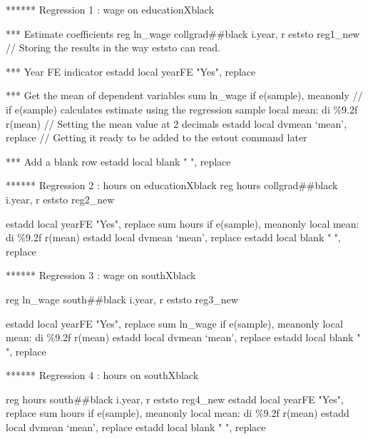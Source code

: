        
        ****** Regression 1 : wage on educationXblack
        
                *** Estimate coefficients
                reg ln_wage collgrad\#\#black i.year, r
                eststo reg1_new // Storing the results in the way eststo can read.
                        
                *** Year FE indicator
                estadd local yearFE "Yes", replace 
                
                *** Get the mean of dependent variables 
                sum ln_wage if e(sample), meanonly // if e(sample) calculates estimate using the regression sample
                local mean: di \%9.2f r(mean) // Setting the mean value at 2 decimals
                estadd local dvmean `mean', replace // Getting it ready to be added to the estout command later
                
                *** Add a blank row 
                estadd local blank " ", replace
                
        
        ****** Regression 2 : hours on educationXblack
{\smallskip}
                reg hours collgrad\#\#black i.year, r
                eststo reg2_new
                
                estadd local yearFE "Yes", replace 
                sum hours if e(sample), meanonly 
                local mean: di \%9.2f r(mean) 
                estadd local dvmean `mean', replace 
                estadd local blank " ", replace
                
        
        
        ****** Regression 3 : wage on southXblack
        
                reg ln_wage south\#\#black i.year, r
                eststo reg3_new
                
                estadd local yearFE "Yes", replace 
                sum ln_wage if e(sample), meanonly 
                local mean: di \%9.2f r(mean) 
                estadd local dvmean `mean', replace 
                estadd local blank " ", replace
{\smallskip}
        
        ****** Regression 4 : hours on southXblack              
        
                reg hours south\#\#black i.year, r
                eststo reg4_new
{\smallskip}
                estadd local yearFE "Yes", replace 
                sum hours if e(sample), meanonly 
                local mean: di \%9.2f r(mean) 
                estadd local dvmean `mean', replace 
                estadd local blank " ", replace
                
